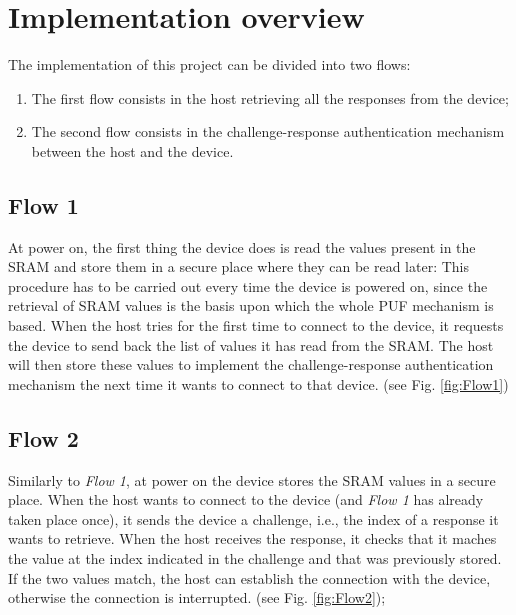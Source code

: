 

\section{Implementation overview}
The implementation of this project can be divided into two flows:
\begin{enumerate}
	\item The first flow consists in the host retrieving all the responses from the device;


	\item The second flow consists in the challenge-response authentication mechanism between the host and the device.
\end{enumerate}


\subsection {Flow 1} \label{subsection:flow1}
At power on, the first thing the device does is read the values present in the SRAM and store them in a secure place where they can be read later: This procedure has to be carried out every time the device is powered on, since the retrieval of SRAM values is the basis upon which the whole PUF mechanism is based.
When the host tries for the first time to connect to the device, it requests the device to send back the list of values it has read from the SRAM. The host will then store these values to implement the  challenge-response authentication mechanism the next time it wants to connect to that device. (see Fig. \ref{fig:Flow1})


\subsection {Flow 2} \label{subsection:flow2}
Similarly to \emph{Flow 1}, at power on the device stores the SRAM values in a secure place. When the host wants to connect to the device (and \emph{Flow 1} has already taken place once), it sends the device a challenge, i.e., the index of a response it wants to retrieve. When the host receives the response, it checks that it maches the value at the index indicated in the challenge and that was previously stored. If the two values match, the host can establish the connection with the device, otherwise the connection is interrupted. (see Fig. \ref{fig:Flow2});

